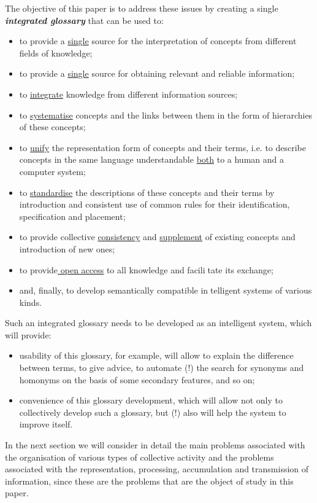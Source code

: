 \documentclass[10pt, a4paper]{article}
\begin{document}
\begin{multicols}{2}
The objective of this paper is to address these issues
by creating a single \textbf{\textit{integrated glossary}} that can be used
to:
\begin{itemize}
    \item to provide a \underline {single} source for the interpretation of
concepts from different fields of knowledge;
    \item to provide a \underline {single} source for obtaining relevant and
reliable information;
    \item to \underline {integrate} knowledge from different information
sources;
    \item to \underline {systematise} concepts and the links between them
in the form of hierarchies of these concepts;
    \item to \underline {unify} the representation form of concepts and
their terms, i.e. to describe concepts in the same
language understandable \underline {both} to a human and a
computer system;
    \item to \underline {standardise} the descriptions of these concepts and
their terms by introduction and consistent use of
common rules for their identification, specification
and placement;
    \item to provide collective \underline {consistency} and \underline {supplement} of
existing concepts and introduction of new ones;
    \item to provide\underline { open access}  to all knowledge and facilitate its exchange;
    \item and, finally, to develop semantically compatible intelligent systems of various kinds. 
\end{itemize}

Such an integrated glossary needs to be developed as
an intelligent system, which will provide:
\begin{itemize}
    \item usability of this glossary, for example, will allow
to explain the difference between terms, to give
advice, to automate (!) the search for synonyms and
homonyms on the basis of some secondary features,
and so on;
\item convenience of this glossary development, which
will allow not only to collectively develop such a
glossary, but (!) also will help the system to improve
itself.
\end{itemize}

In the next section we will consider in detail the main
problems associated with the organisation of various
types of collective activity and the problems associated
with the representation, processing, accumulation and
transmission of information, since these are the problems
that are the object of study in this paper.

\end{multicols}
\end{document}
